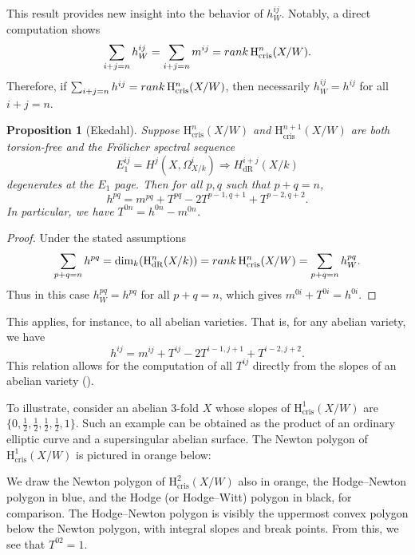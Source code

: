 \documentclass[a4paper,12pt,twoside]{report}
\newtheorem{proposition}[theorem]{Proposition}
\newcommand{\cris}{\mathrm{cris}}
\newcommand{\dR}{\mathrm{dR}}
\newcommand{\HH}{\mathrm{H}}
\begin{document}
This result provides new insight into the behavior of $h_W^{ij}$. 
Notably, a direct computation shows
\[\sum_{i+j=n}h^{ij}_W=\sum_{i+j=n}m^{ij}={\rm rank} \, \HH^n_{\cris}(X/W).\]
Therefore, if $\sum_{i+j=n} h^{ij}={\rm rank}\, \HH^n_{\cris}(X/W)$, 
then necessarily $h^{ij}_W=h^{ij}$ for all $i+j=n$. 

\begin{proposition}[Ekedahl]
    Suppose $\HH^n_{\cris}(X/W)$ and $\HH^{n+1}_{\cris}(X/W)$ are both torsion-free
    and the Fr\"olicher spectral sequence 
    \[E_1^{ij}=H^j(X,\Omega^i_{X/k})\Rightarrow H^{i+j}_{\dR}(X/k)\]
    degenerates at the $E_1$ page. Then for all $p,q$ such that $p+q=n$,
    \[h^{pq}=m^{pq}+T^{pq}-2T^{p-1,q+1}+T^{p-2,q+2}.\] 
    In particular, we have $T^{0n}=h^{0n}-m^{0n}$. 
\end{proposition}

\begin{proof} Under the stated assumptions \begin{equation*}
    \sum_{p+q=n}h^{pq}=\dim_k(\HH^n_{\dR}(X/k))={\rm rank}\,\HH^n_{\cris}(X/W)=\sum_{p+q=n}h_W^{pq}.
\end{equation*}
Thus in this case $h^{pq}_W=h^{pq}$ for all $p+q=n$, 
which gives $m^{0i}+T^{0i}=h^{0i}$. \end{proof}

This applies, for instance, to all abelian varieties. 
That is, for any abelian variety, we have \[h^{ij}=m^{ij}+T^{ij}-2T^{i-1,j+1}+T^{i-2,j+2}.\]
This relation allows for the computation of all $T^{ij}$ directly from the 
slopes of an abelian variety (\cite[Corollary 6.3.12]{I2}). 

To illustrate, consider an abelian 3-fold $X$ whose slopes of $\HH^1_{\cris}(X/W)$ 
are $\{0,\frac{1}{2},\frac{1}{2},\frac{1}{2},\frac{1}{2},1\}$. 
Such an example can be obtained as the product of an ordinary elliptic curve and a supersingular abelian surface. 
The Newton polygon of $\HH^1_{\cris}(X/W)$ is pictured in orange below: 
\begin{center}
\end{center}
We draw the Newton polygon of $\HH^2_{\cris}(X/W)$ also in orange, 
the Hodge--Newton polygon in blue, 
and the Hodge (or Hodge--Witt) polygon in black, for comparison. 
The Hodge--Newton polygon is visibly the uppermost convex polygon below the Newton polygon, 
with integral slopes and break points. From this, we see that $T^{02}=1$. 
\end{document}
